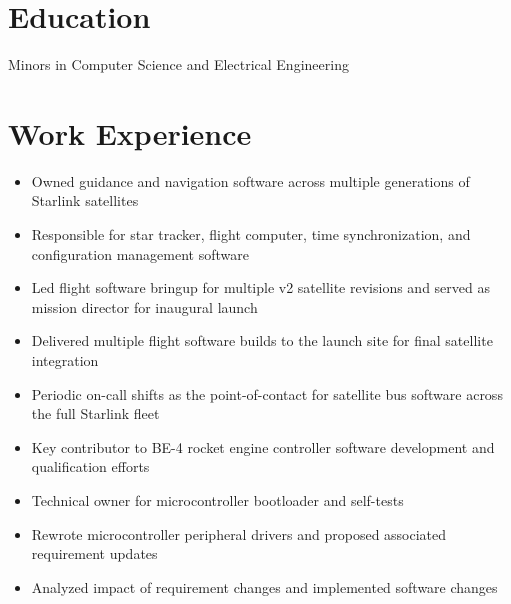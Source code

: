 \documentclass{resume}
\begin{document}

\section{Education}
Minors in Computer Science and Electrical Engineering

\section{Work Experience}
\begin{itemize}
    \item Owned guidance and navigation software across multiple generations of Starlink satellites
    \item Responsible for star tracker, flight computer, time synchronization, and configuration management software
    \item Led flight software bringup for multiple v2 satellite revisions and served as mission director for inaugural launch
    \item Delivered multiple flight software builds to the launch site for final satellite integration
    \item Periodic on-call shifts as the point-of-contact for satellite bus software across the full Starlink fleet
\end{itemize}
\begin{itemize}
    \item Key contributor to BE-4 rocket engine controller software development and qualification efforts
    \item Technical owner for microcontroller bootloader and self-tests
    \item Rewrote microcontroller peripheral drivers and proposed associated requirement updates
    \item Analyzed impact of requirement changes and implemented software changes
\end{itemize}
\end{document}
